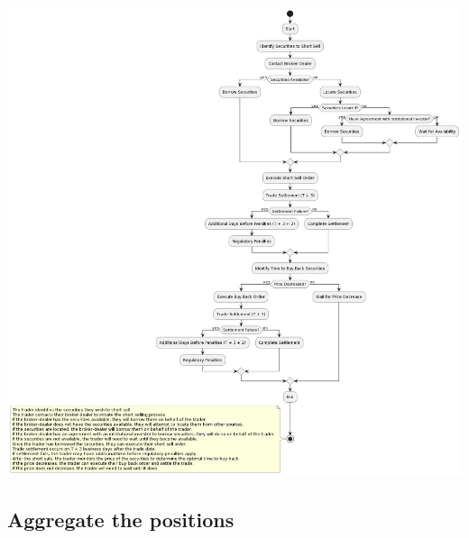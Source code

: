 \documentclass[11pt]{article}
\begin{document}
\begin{center}
\includegraphics[width=.9\linewidth]{./SS_Trader.png}
\end{center}
\subsection{Aggregate the positions}
\label{sec:org94dffdd}
\end{document}
